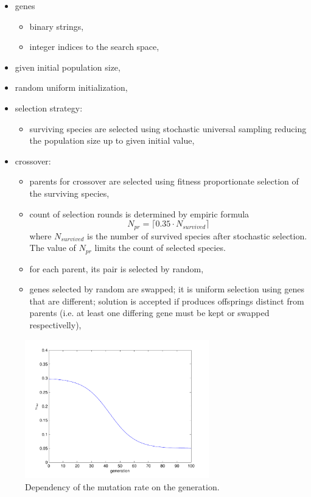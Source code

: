 \documentclass[a4paper]{IEEEtran}
\begin{document}
\begin{itemize}
	\item genes 
	\begin{itemize}
		\item binary strings,
		\item integer indices to the search space,
	\end{itemize}
	\item given initial population size,
	\item random uniform initialization,
	\item selection strategy:
	\begin{itemize}
		\item surviving species are selected using stochastic universal 
		sampling reducing the population size up to given initial value,
	\end{itemize}
	\item crossover:
	\begin{itemize}
		\item parents for crossover are selected using fitness proportionate
		selection of the surviving species,
		\item count of selection rounds is determined by empiric formula
		\[ N_{pr} = \lceil 0.35\cdot N_{survived} \rceil \] 		
		where $ N_{survived} $ is the number of survived species after stochastic selection.
		The value of $ N_{pr} $ limits the count of selected species.
		\item for each parent, its pair is selected by random,
		\item genes selected by random are swapped; it is uniform selection using 
		genes that are different; solution is accepted if
		produces  offsprings distinct from parents (i.e. at least one differing gene must be kept or swapped respectivelly),
	\end{itemize}
\end{itemize}
\begin{figure}[!h]
	\centering
	\includegraphics[width=80mm]{mut_r}
	\caption{Dependency of the mutation rate on the generation.}
	\label{fig:mut_r}
\end{figure}
\end{document}
